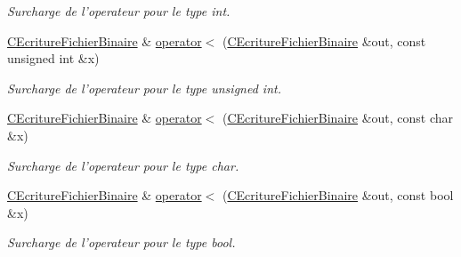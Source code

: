 \begin{DoxyCompactItemize}
\begin{DoxyCompactList}\small\item\em Surcharge de l'operateur pour le type {\itshape int}. \end{DoxyCompactList}\item 
\hypertarget{class_c_ecriture_fichier_binaire_a38d0f050dcc8a79522b0fb9b9c591f72}{\hyperlink{class_c_ecriture_fichier_binaire}{C\-Ecriture\-Fichier\-Binaire} \& \hyperlink{class_c_ecriture_fichier_binaire_a38d0f050dcc8a79522b0fb9b9c591f72}{operator$<$} (\hyperlink{class_c_ecriture_fichier_binaire}{C\-Ecriture\-Fichier\-Binaire} \&out, const unsigned int \&x)}\label{class_c_ecriture_fichier_binaire_a38d0f050dcc8a79522b0fb9b9c591f72}

\begin{DoxyCompactList}\small\item\em Surcharge de l'operateur pour le type {\itshape unsigned} {\itshape int}. \end{DoxyCompactList}\item 
\hypertarget{class_c_ecriture_fichier_binaire_a3cb25116e2558d967dfd21e812e47a3e}{\hyperlink{class_c_ecriture_fichier_binaire}{C\-Ecriture\-Fichier\-Binaire} \& \hyperlink{class_c_ecriture_fichier_binaire_a3cb25116e2558d967dfd21e812e47a3e}{operator$<$} (\hyperlink{class_c_ecriture_fichier_binaire}{C\-Ecriture\-Fichier\-Binaire} \&out, const char \&x)}\label{class_c_ecriture_fichier_binaire_a3cb25116e2558d967dfd21e812e47a3e}

\begin{DoxyCompactList}\small\item\em Surcharge de l'operateur pour le type {\itshape char}. \end{DoxyCompactList}\item 
\hypertarget{class_c_ecriture_fichier_binaire_a37080aca11f391be69941db70093f77d}{\hyperlink{class_c_ecriture_fichier_binaire}{C\-Ecriture\-Fichier\-Binaire} \& \hyperlink{class_c_ecriture_fichier_binaire_a37080aca11f391be69941db70093f77d}{operator$<$} (\hyperlink{class_c_ecriture_fichier_binaire}{C\-Ecriture\-Fichier\-Binaire} \&out, const bool \&x)}\label{class_c_ecriture_fichier_binaire_a37080aca11f391be69941db70093f77d}

\begin{DoxyCompactList}\small\item\em Surcharge de l'operateur pour le type {\itshape bool}. \end{DoxyCompactList}\end{DoxyCompactItemize}


